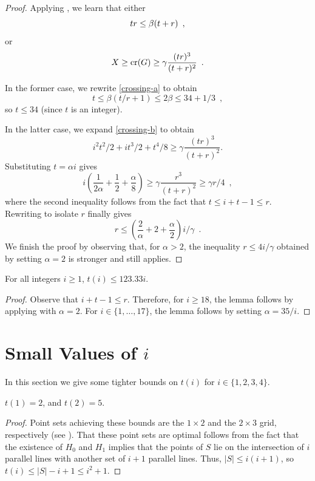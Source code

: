 \documentclass{cccg10}
\DeclareMathOperator{\cn}{cr}
\begin{document}
\begin{proof}
Applying , we learn that either
\begin{equation}
   tr \le \beta (t+r) \enspace , \eqlabel{crossing-a}
\end{equation}
or
\begin{equation}
   X \ge \cn(G) \ge \gamma \frac{(tr)^3}{(t+r)^2} \eqlabel{crossing-b} \enspace .
\end{equation}

In the former case, we rewrite \eqref{crossing-a} to obtain
\[
   t \le \beta(t/r + 1) \le 2\beta \le 34 + 1/3 \enspace ,
\]
so $t\le 34$ (since $t$ is an integer).

In the latter case, we expand \eqref{crossing-b} to obtain
\[ i^2t^2/2 + it^3/2 + t^4/8 \ge \gamma\frac{(tr)^3}{(t+r)^2} .  \]
Substituting $t=\alpha i$ gives
\[ i\left(\frac{1}{2\alpha} 
    + \frac{1}{2}+\frac{\alpha}{8}\right) 
      \ge \gamma \frac{r^3}{(t+r)^2} \ge \gamma r/ 4 \enspace ,
\]
where the second inequality follows from the fact that $t\le i+t-1 \le r$.
Rewriting to isolate $r$ finally gives
\[
  r \le \left(\frac{2}{\alpha} + 2 +\frac{\alpha}{2}\right)i/\gamma \enspace .
\]
We finish the proof by observing that, for $\alpha > 2$, the inequality
$r\le 4i/\gamma$ obtained by setting $\alpha=2$ is stronger and still
applies.
\end{proof}

\begin{lem}
For all integers $i\ge 1$, $t(i) \le 123.33i$.
\end{lem}

\begin{proof}
Observe that $i+t-1\le r$.  Therefore, for $i\ge 18$, the lemma
follows by applying  with $\alpha=2$.
For $i\in\{1,\ldots,17\}$, the lemma follows by setting $\alpha = 35/i$.
\end{proof}

\section{Small Values of $i$}

In this section we give some tighter bounds on $t(i)$ for $i\in\{1,2,3,4\}$.

\begin{lem}
$t(1) = 2$, and $t(2)=5$.
\end{lem}

\begin{proof}
Point sets achieving these bounds are the $1\times 2$ and the $2\times
3$ grid, respectively (see ).  That these point sets are
optimal follows from the fact that the existence of $H_0$ and $H_1$
implies that the points of $S$ lie on the intersection of $i$ parallel
lines with another set of $i+1$ parallel lines.  Thus, $|S|\le i(i+1)$,
so $t(i) \le |S|-i+1\le i^2+1$.
\end{proof}
\end{document}
